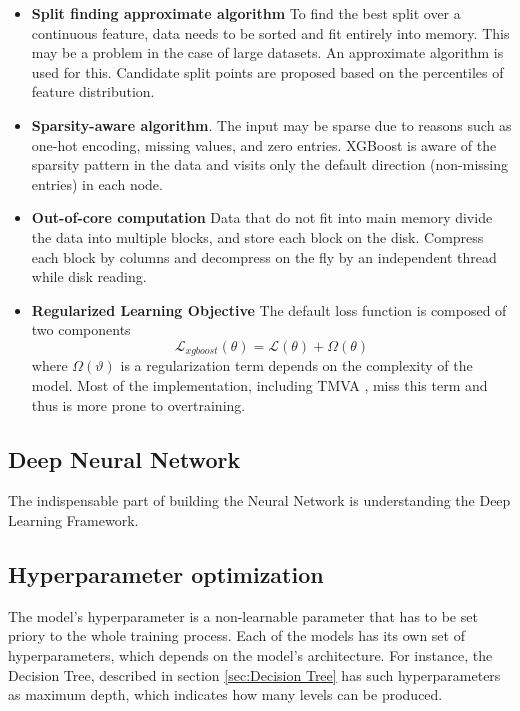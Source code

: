 \begin{itemize}
    \item \textbf{Split finding approximate algorithm} To find the best split over a continuous feature, data needs to be sorted and fit entirely into memory. This may be a problem in the case of large datasets.
    An approximate algorithm is used for this. Candidate split points are proposed based on the percentiles of feature distribution.
    \item  \textbf{Sparsity-aware algorithm}. The input may be sparse due to reasons such as one-hot encoding, missing values, and zero entries. XGBoost is aware of the sparsity pattern in the data and visits only the default direction (non-missing entries) in each node.
    \item  \textbf{Out-of-core computation} 
    Data that do not fit into main memory divide the data into multiple blocks, and store each block on the disk. Compress each block by columns and decompress on the fly by an independent thread while disk reading.
    \item \textbf{Regularized Learning Objective} The default loss function is composed of two components 
    \begin{equation}
        \mathcal{L}_{xgboost}(\theta) = \mathcal{L}(\theta) + \Omega(\theta)
    \end{equation}
    where $\Omega(\vartheta)$ is a  regularization term depends on the complexity of the model. Most of the implementation, including TMVA \cite{tmva}, miss this term and thus is more prone to overtraining. 
\end{itemize}


\subsection{Deep Neural Network}
\label{sec:DNN}
The indispensable part of building the Neural Network is understanding the Deep Learning Framework. 


\subsection{Hyperparameter optimization}
\label{sec:hyperparameters}

The model's hyperparameter is a non-learnable parameter that has to be set priory to the whole training process. Each of the models has its own set of hyperparameters, which depends on the model's architecture. For instance, the Decision Tree, described in section \ref{sec:Decision Tree} has such hyperparameters as maximum depth, which indicates how many levels can be produced. 

